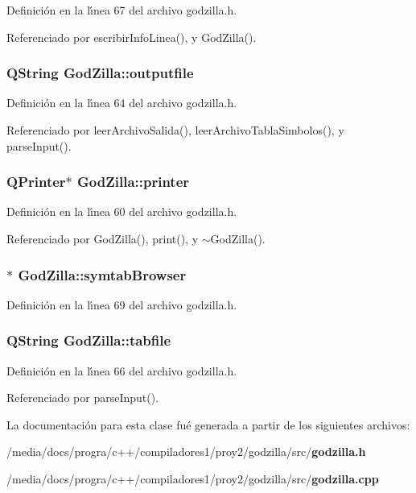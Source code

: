 Definici\'{o}n en la l\'{\i}nea 67 del archivo godzilla.h.

Referenciado por escribir\-Info\-Linea(), y God\-Zilla().
\subsubsection{\setlength{\rightskip}{0pt plus 5cm}QString {\bf God\-Zilla::outputfile}\hspace{0.3cm}{\tt  [private]}}\label{classGodZilla_r4}




Definici\'{o}n en la l\'{\i}nea 64 del archivo godzilla.h.

Referenciado por leer\-Archivo\-Salida(), leer\-Archivo\-Tabla\-Simbolos(), y parse\-Input().
\subsubsection{\setlength{\rightskip}{0pt plus 5cm}QPrinter$\ast$ {\bf God\-Zilla::printer}\hspace{0.3cm}{\tt  [private]}}\label{classGodZilla_r0}




Definici\'{o}n en la l\'{\i}nea 60 del archivo godzilla.h.

Referenciado por God\-Zilla(), print(), y $\sim$God\-Zilla().
\subsubsection{$\ast$ {\bf God\-Zilla::symtab\-Browser}\hspace{0.3cm}{\tt  [private]}}\label{classGodZilla_r9}




Definici\'{o}n en la l\'{\i}nea 69 del archivo godzilla.h.
\subsubsection{\setlength{\rightskip}{0pt plus 5cm}QString {\bf God\-Zilla::tabfile}\hspace{0.3cm}{\tt  [private]}}\label{classGodZilla_r6}




Definici\'{o}n en la l\'{\i}nea 66 del archivo godzilla.h.

Referenciado por parse\-Input().

La documentaci\'{o}n para esta clase fu\'{e} generada a partir de los siguientes archivos:\begin{CompactItemize}
\item 
/media/docs/progra/c++/compiladores1/proy2/godzilla/src/{\bf godzilla.h}\item 
/media/docs/progra/c++/compiladores1/proy2/godzilla/src/{\bf godzilla.cpp}\end{CompactItemize}
